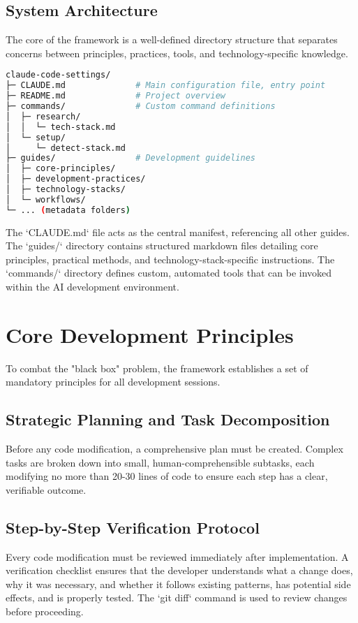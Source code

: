 \documentclass[preprint,12pt]{elsarticle}
\begin{document}
\subsection{System Architecture}
The core of the framework is a well-defined directory structure that separates concerns between principles, practices, tools, and technology-specific knowledge.
\begin{lstlisting}[language=bash, caption={Framework Directory Structure}]
claude-code-settings/
├─ CLAUDE.md              # Main configuration file, entry point
├─ README.md              # Project overview
├─ commands/              # Custom command definitions
│  ├─ research/
│  │  └─ tech-stack.md
│  └─ setup/
│     └─ detect-stack.md
├─ guides/                # Development guidelines
│  ├─ core-principles/
│  ├─ development-practices/
│  ├─ technology-stacks/
│  └─ workflows/
└─ ... (metadata folders)
\end{lstlisting}
The `CLAUDE.md` file acts as the central manifest, referencing all other guides. The `guides/` directory contains structured markdown files detailing core principles, practical methods, and technology-stack-specific instructions. The `commands/` directory defines custom, automated tools that can be invoked within the AI development environment.

\section{Core Development Principles}
To combat the "black box" problem, the framework establishes a set of mandatory principles for all development sessions.

\subsection{Strategic Planning and Task Decomposition}
Before any code modification, a comprehensive plan must be created. Complex tasks are broken down into small, human-comprehensible subtasks, each modifying no more than 20-30 lines of code to ensure each step has a clear, verifiable outcome.

\subsection{Step-by-Step Verification Protocol}
Every code modification must be reviewed immediately after implementation. A verification checklist ensures that the developer understands what a change does, why it was necessary, and whether it follows existing patterns, has potential side effects, and is properly tested. The `git diff` command is used to review changes before proceeding.
\end{document}
